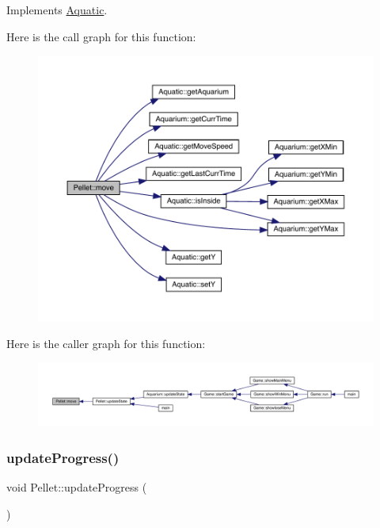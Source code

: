 Implements \mbox{\hyperlink{class_aquatic_a962e93c804814eeaf3cea6e26698eef7}{Aquatic}}.

Here is the call graph for this function\+:\nopagebreak
\begin{figure}[H]
\begin{center}
\leavevmode
\includegraphics[width=350pt]{class_pellet_a7385101b04083be663ae465c38fd2a4d_cgraph}
\end{center}
\end{figure}
Here is the caller graph for this function\+:
\nopagebreak
\begin{figure}[H]
\begin{center}
\leavevmode
\includegraphics[width=350pt]{class_pellet_a7385101b04083be663ae465c38fd2a4d_icgraph}
\end{center}
\end{figure}
\mbox{\label{class_pellet_a1a7203cff52c771eb8cc62a91620e3ca}} 
\subsubsection{\texorpdfstring{update\+Progress()}{updateProgress()}}
{\footnotesize\ttfamily void Pellet\+::update\+Progress (\begin{DoxyParamCaption}{ }\end{DoxyParamCaption})\hspace{0.3cm}{\ttfamily [virtual]}}



